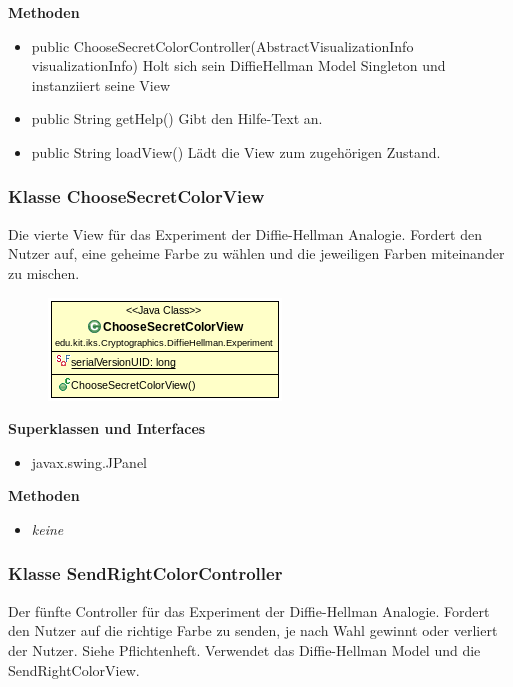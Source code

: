 \documentclass{article}
\begin{document}
      \textbf{Methoden}
      \begin{itemize}
          \item public ChooseSecretColorController(AbstractVisualizationInfo visualizationInfo) \newline
              Holt sich sein DiffieHellman Model Singleton und instanziiert seine View
        \item public String getHelp() \newline
        Gibt den Hilfe-Text an.
        \item public String loadView() \newline
        Lädt die View zum zugehörigen Zustand.
      \end{itemize}

\subsubsection{Klasse ChooseSecretColorView}
      Die vierte View für das Experiment der Diffie-Hellman Analogie.
      Fordert den Nutzer auf, eine geheime Farbe zu wählen und die
      jeweiligen Farben miteinander zu mischen.

      \begin{figure}[H]
        \centering
        \includegraphics{resources/edu-kit-iks-Cryptographics-DiffieHellman-Experiment-ChooseSecretColorView}
      \end{figure}

      \textbf{Superklassen und Interfaces}
      \begin{itemize}
        \item javax.swing.JPanel
      \end{itemize}

      \textbf{Methoden}
      \begin{itemize}
        \item \textit{keine}
      \end{itemize}

\subsubsection{Klasse SendRightColorController}
      Der fünfte Controller für das Experiment der Diffie-Hellman Analogie.
      Fordert den Nutzer auf die richtige Farbe zu senden,
      je nach Wahl gewinnt oder verliert der Nutzer. Siehe Pflichtenheft.
      Verwendet das Diffie-Hellman Model und die SendRightColorView.
\end{document}
